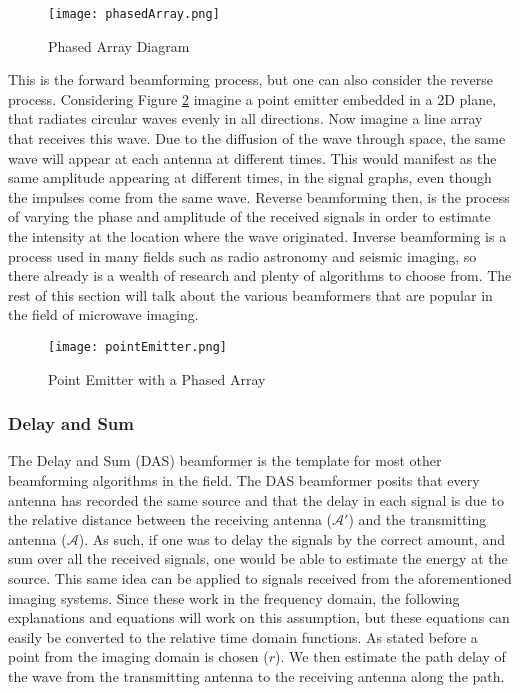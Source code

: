 \begin{figure}[!h]
    \texttt{[image: phasedArray.png]}
    \centering
    \caption{Phased Array Diagram}
    \label{fig:phasedArray}
\end{figure}

This is the forward beamforming process, but one can also consider the reverse process. Considering Figure \ref{fig:pointEmitter} imagine a point emitter
embedded in a 2D plane, that radiates circular waves evenly in all directions. Now imagine a line array that receives
this wave. Due to the diffusion of the wave through space, the same wave will appear at each antenna at different times. This would
manifest as the same amplitude appearing at different times, in the signal graphs, even though the impulses come from
the same wave. Reverse beamforming then, is the process of varying the phase and amplitude of the received signals in
order to estimate the intensity at the location where the wave originated. Inverse beamforming is a process used in many
fields such as radio astronomy and seismic imaging, so there already is a wealth of research and plenty of algorithms to
choose from. The rest of this section will talk about the various beamformers that are popular in the field of microwave
imaging. \hfill \break

\begin{figure}
    \texttt{[image: pointEmitter.png]}
    \centering
    \caption{Point Emitter with a Phased Array}
    \label{fig:pointEmitter}
\end{figure}

\subsubsection{Delay and Sum}
The Delay and Sum (DAS) beamformer is the template for most other beamforming algorithms in the field. The DAS
beamformer posits that every antenna has recorded the same source and that the delay in each signal is
due to the relative distance between the receiving antenna ($\mathcal{A}'$) and the transmitting antenna
($\mathcal{A}$). As such, if one was to delay the signals by the correct amount, and sum over all the received signals,
one would be able to estimate the energy at the source. This same idea can be applied to signals received from the
aforementioned imaging systems. Since these work in the frequency domain, the following explanations and equations will
work on this assumption, but these equations can easily be converted to the relative time domain functions. As stated
before a point from the imaging domain is chosen ($r$). We then estimate the path delay of the wave from the
transmitting antenna to the receiving antenna along the path.

